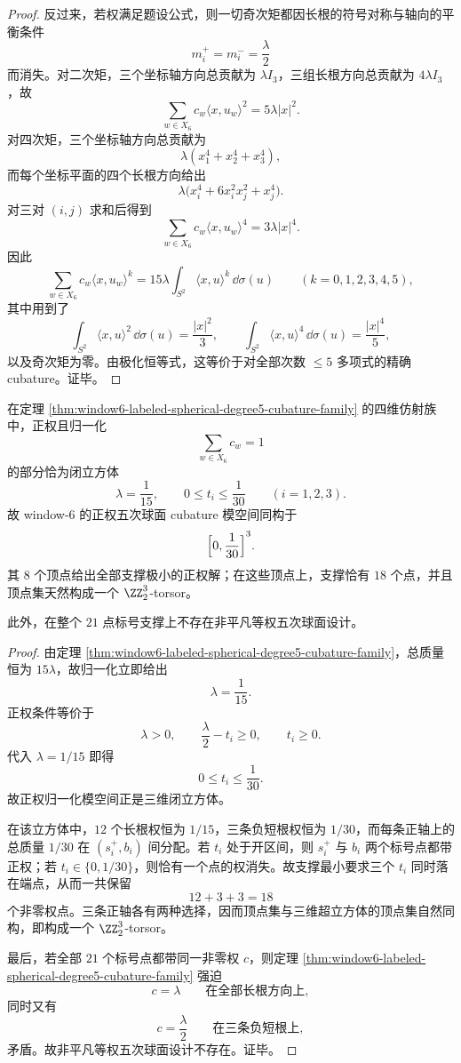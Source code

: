 \begin{proof}
反过来，若权满足题设公式，则一切奇次矩都因长根的符号对称与轴向的平衡条件
\[
m_i^+=m_i^-=\frac{\lambda}{2}
\]
而消失。对二次矩，三个坐标轴方向总贡献为 \(\lambda I_3\)，三组长根方向总贡献为 \(4\lambda I_3\)，故
\[
\sum_{w\in X_6}c_w\langle x,u_w\rangle^2=5\lambda |x|^2.
\]
对四次矩，三个坐标轴方向总贡献为
\[
\lambda(x_1^4+x_2^4+x_3^4),
\]
而每个坐标平面的四个长根方向给出
\[
\lambda\bigl(x_i^4+6x_i^2x_j^2+x_j^4\bigr).
\]
对三对 \((i,j)\) 求和后得到
\[
\sum_{w\in X_6}c_w\langle x,u_w\rangle^4=3\lambda |x|^4.
\]
因此
\[
\sum_{w\in X_6}c_w\langle x,u_w\rangle^k
=
15\lambda\int_{S^2}\langle x,u\rangle^k\,\dd\sigma(u)
\qquad (k=0,1,2,3,4,5),
\]
其中用到了
\[
\int_{S^2}\langle x,u\rangle^2\,\dd\sigma(u)=\frac{|x|^2}{3},
\qquad
\int_{S^2}\langle x,u\rangle^4\,\dd\sigma(u)=\frac{|x|^4}{5},
\]
以及奇次矩为零。由极化恒等式，这等价于对全部次数 \(\le 5\) 多项式的精确 cubature。证毕。
\end{proof}

\begin{proposition}\label{prop:window6-labeled-spherical-degree5-cubature-cube}
在定理 \ref{thm:window6-labeled-spherical-degree5-cubature-family} 的四维仿射族中，正权且归一化
\[
\sum_{w\in X_6}c_w=1
\]
的部分恰为闭立方体
\[
\lambda=\frac{1}{15},
\qquad
0\le t_i\le \frac{1}{30}
\qquad (i=1,2,3).
\]
故 window-\(6\) 的正权五次球面 cubature 模空间同构于
\[
{\Bigl[0,\frac{1}{30}\Bigr]}^{3}.
\]
其 \(8\) 个顶点给出全部支撑极小的正权解；在这些顶点上，支撑恰有 \(18\) 个点，并且顶点集天然构成一个 \(\ZZ_2^3\)-torsor。

此外，在整个 \(21\) 点标号支撑上不存在非平凡等权五次球面设计。
\end{proposition}
\begin{proof}
由定理 \ref{thm:window6-labeled-spherical-degree5-cubature-family}，总质量恒为 \(15\lambda\)，故归一化立即给出
\[
\lambda=\frac{1}{15}.
\]
正权条件等价于
\[
\lambda>0,
\qquad
\frac{\lambda}{2}-t_i\ge 0,
\qquad
t_i\ge 0.
\]
代入 \(\lambda=1/15\) 即得
\[
0\le t_i\le \frac{1}{30}.
\]
故正权归一化模空间正是三维闭立方体。

在该立方体中，\(12\) 个长根权恒为 \(1/15\)，三条负短根权恒为 \(1/30\)，而每条正轴上的总质量 \(1/30\) 在 \((s_i^+,b_i)\) 间分配。若 \(t_i\) 处于开区间，则 \(s_i^+\) 与 \(b_i\) 两个标号点都带正权；若 \(t_i\in\{0,1/30\}\)，则恰有一个点的权消失。故支撑最小要求三个 \(t_i\) 同时落在端点，从而一共保留
\[
12+3+3=18
\]
个非零权点。三条正轴各有两种选择，因而顶点集与三维超立方体的顶点集自然同构，即构成一个 \(\ZZ_2^3\)-torsor。

最后，若全部 \(21\) 个标号点都带同一非零权 \(c\)，则定理 \ref{thm:window6-labeled-spherical-degree5-cubature-family} 强迫
\[
c=\lambda
\qquad\text{在全部长根方向上},
\]
同时又有
\[
c=\frac{\lambda}{2}
\qquad\text{在三条负短根上},
\]
矛盾。故非平凡等权五次球面设计不存在。证毕。
\end{proof}


